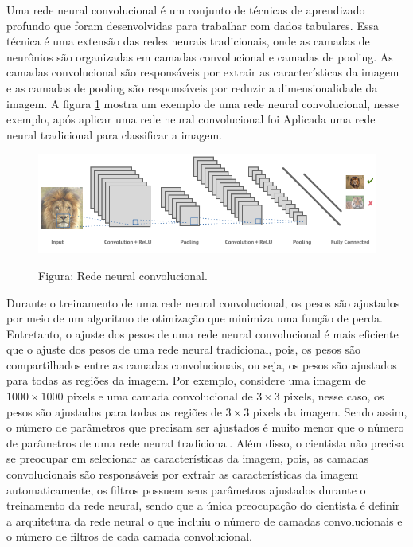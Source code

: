 \documentclass[12pt]{article}
\begin{document}
Uma rede neural convolucional \cite{Goodfellow-et-al-2016} é um conjunto de técnicas de aprendizado profundo que foram desenvolvidas para trabalhar com dados tabulares. Essa técnica é uma extensão das redes neurais tradicionais, onde as camadas de neurônios são organizadas em camadas convolucional e camadas de pooling. As camadas convolucional são responsáveis por extrair as características da imagem e as camadas de pooling são responsáveis por reduzir a dimensionalidade da imagem. A figura \ref{fig:conv} mostra um exemplo de uma rede neural convolucional, nesse exemplo, após aplicar uma rede neural convolucional foi Aplicada uma rede neural tradicional para classificar a imagem.


\begin{figure}[H]
\centering
\includegraphics[scale=0.45]{conv.png}
\label{fig:conv}
\begin{center}
Figura: Rede neural convolucional.
\end{center}
\end{figure}


Durante o treinamento de uma rede neural convolucional, os pesos são ajustados por meio de um algoritmo de otimização que minimiza uma função de perda. Entretanto, o ajuste dos pesos de uma rede neural convolucional é mais eficiente que o ajuste dos pesos de uma rede neural tradicional, pois, os pesos são compartilhados entre as camadas convolucionais, ou seja, os pesos são ajustados para todas as regiões da imagem. Por exemplo, considere uma imagem de $1000\times1000$ pixels e uma camada convolucional de $3\times3$ pixels, nesse caso, os pesos são ajustados para todas as regiões de $3\times3$ pixels da imagem. Sendo assim, o número de parâmetros que precisam ser ajustados é muito menor que o número de parâmetros de uma rede neural tradicional. Além disso, o cientista não precisa se preocupar em selecionar as características da imagem, pois, as camadas convolucionais são responsáveis por extrair as características da imagem automaticamente, os filtros possuem seus parâmetros ajustados durante o treinamento da rede neural, sendo que a única preocupação do cientista é definir a arquitetura da rede neural o que incluiu o número de camadas convolucionais e o número de filtros de cada camada convolucional.
\end{document}
